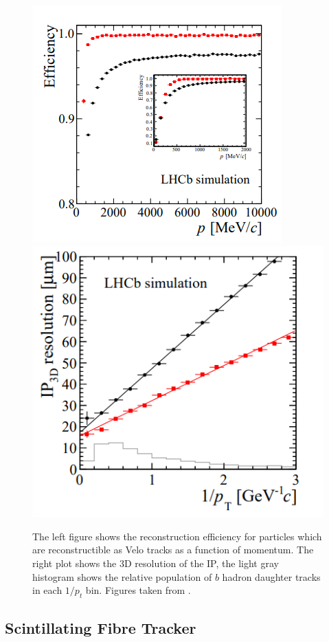 \begin{figure}[!h]
 \begin{center}
  \includegraphics[width=0.49\linewidth]{figures/Velo_upgrade_tracking.PNG}
   \includegraphics[width=0.49\linewidth]{figures/Velo_upgrade_IP.PNG}
    \caption{The left figure shows the reconstruction efficiency for particles which are reconstructible as Velo tracks as a function of momentum. The right plot shows the  3D resolution of the IP, the light gray histogram shows the relative population of $b$ hadron daughter tracks in each $1/p_t$ bin. Figures taken from \cite{velo_upgrade_tdr}.}%
    \label{fig:upgrade_velo_performance}%
 \end{center}
\end{figure}

\subsection{Scintillating Fibre Tracker}

